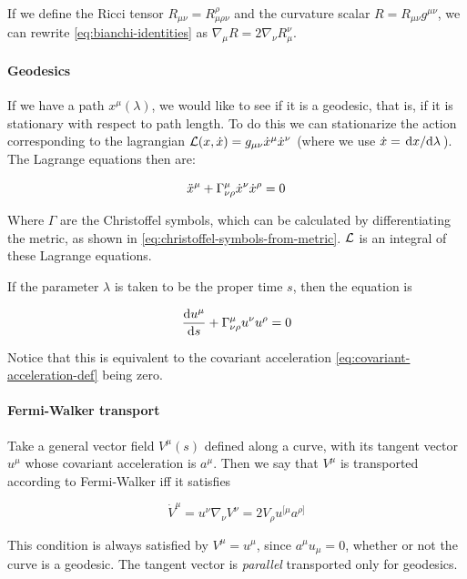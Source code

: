 \documentclass[main.tex]{subfiles}
\begin{document}
If we define the Ricci tensor \(R_{\mu\nu} = R^\rho_{\mu \rho \nu}\) and the curvature scalar \(R = R_{\mu\nu}g^{\mu\nu}\), we can rewrite \eqref{eq:bianchi-identities}  as \(\nabla_\mu R = 2 \nabla_\nu R^{\nu}_{\mu}\).

\paragraph{Geodesics}

If we have a path $x^\mu(\lambda)$, we would like to see if it is a geodesic, that is, if it is stationary with respect to path length. To do this we can stationarize the action corresponding to the lagrangian $\mathcal{L} (x, \Dot{x}) = g_{\mu\nu} \Dot{x}^\mu \Dot{x}^\nu$ (where we use $\Dot{x} = \dv*{x}{\lambda}$). The Lagrange equations then are:

\begin{equation}
    \Ddot{x}^\mu + \Gamma^\mu_{\nu\rho} \Dot{x}^\nu \Dot{x}^\rho = 0
\end{equation}

Where $\Gamma$ are the Christoffel symbols, which can be calculated by differentiating the metric, as shown in \eqref{eq:christoffel-symbols-from-metric}. $\mathcal{L}$ is an integral of these Lagrange equations.

If the parameter $\lambda$ is taken to be the proper time $s$, then the equation is

\begin{equation}
    \dv{u^\mu}{s} + \Gamma^\mu _{\nu\rho} u^\nu u^\rho = 0
\end{equation}

Notice that this is equivalent to the covariant acceleration \eqref{eq:covariant-acceleration-def} being zero.

\paragraph{Fermi-Walker transport}

Take a general vector field \(V ^{\mu} (s)\) defined along a curve, with its tangent vector \(u^\mu\) whose covariant acceleration is \(a^\mu\).
Then we say that \(V^\mu\) is transported according to Fermi-Walker iff it satisfies

\begin{equation}
    \dot{V}^\mu  = u^\nu \nabla_\nu V^\nu
    = 2 V_\rho u^{[\mu} a^{\rho]}
\end{equation}

This condition is always satisfied by \(V^\mu = u^\mu\), since \(a^\mu u_\mu = 0\), whether or not the curve is a geodesic. The tangent vector is \emph{parallel} transported only for geodesics.
\end{document}
